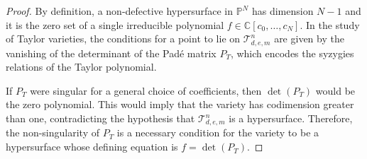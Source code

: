\documentclass[10pt,a4paper]{amsart}
\begin{document}
\begin{proof}
By definition, a non-defective hypersurface in $\mathbb{P}^N$ has dimension $N-1$ and it is the zero set of a single irreducible polynomial $f \in \mathbb{C}[c_0, \dots, c_N]$. In the study of Taylor varieties, the conditions for a point to lie on $\mathcal{T}^{n}_{d,e,m}$ are given by the vanishing of the determinant of the Padé matrix $P_T$, which encodes the syzygies relations of the Taylor polynomial. 

If $P_T$ were singular for a general choice of coefficients, then $\det(P_T)$ would be the zero polynomial. This would imply that the variety has codimension greater than one, contradicting the hypothesis that $\mathcal{T}^{n}_{d,e,m}$ is a hypersurface. Therefore, the non-singularity of $P_T$ is a necessary condition for the variety to be a hypersurface whose defining equation is $f = \det(P_T)$.
\end{proof}
\end{document}
